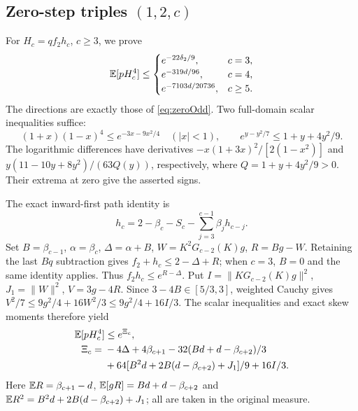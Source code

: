 \subsection[Zero-step triples (1,2,c)]{Zero-step triples $(1,2,c)$}\label{loc:S12}
For $H_c=qf_2h_c$, $c\ge3$, we prove
\[
 \mathbb E[pH_c^4]\le
 \begin{cases}e^{-22\delta_{2}/9},&c=3,\\e^{-319d/96},&c=4,\\
 e^{-7103d/20736},&c\ge5.
 \end{cases}
\]
The directions are exactly those of \eqref{eq:zeroOdd}.
Two full-domain scalar inequalities suffice:
\[
 (1+x)(1-x)^4\le e^{-3x-9x^2/4}\quad(|x|<1),\qquad
 e^{y-y^2/7}\le1+y+4y^2/9.
\]
The logarithmic differences have derivatives
$-x(1+3x)^2/[2(1-x^2)]$ and
$y(11-10y+8y^2)/(63Q(y))$, respectively, where
$Q=1+y+4y^2/9>0$. Their extrema at zero give the asserted signs.

The exact inward-first path identity is
\[
 h_c=2-\beta_c-S_c-\sum_{j=3}^{c-1}\beta_jh_{c-j}.
\]
Set $B=\beta_{c-1}$, $\alpha=\beta_c$, $\Delta=\alpha+B$,
$W=K^2G_{c-2}(K)g$, $R=Bg-W$.
Retaining the last $Bq$ subtraction gives
$f_2+h_c\le2-\Delta+R$; when $c=3$, $B=0$ and the same identity applies.
Thus $f_2h_c\le e^{R-\Delta}$.
Put $I=\|KG_{c-2}(K)g\|^2$, $J_1=\|W\|^2$, $V=3g-4R$.
Since $3-4B\in[5/3,3]$, weighted Cauchy gives
$V^2/7\le9g^2/4+16W^2/3\le9g^2/4+16I/3$.
The scalar inequalities and exact skew moments therefore yield
\begin{align*}
 \mathbb E[pH_c^4]&\le e^{\Xi_c},\\
 \Xi_c={}&-4\Delta+4\beta_{c+1}
       -32(Bd+d-\beta_{c+2})/3\\
 &+64[B^2d+2B(d-\beta_{c+2})+J_1]/9+16I/3.
\end{align*}
Here $\mathbb E R=\beta_{c+1}-d$, $\mathbb E[gR]=Bd+d-\beta_{c+2}$ and
$\mathbb E R^2=B^2d+2B(d-\beta_{c+2})+J_1$; all are taken in the original measure.

